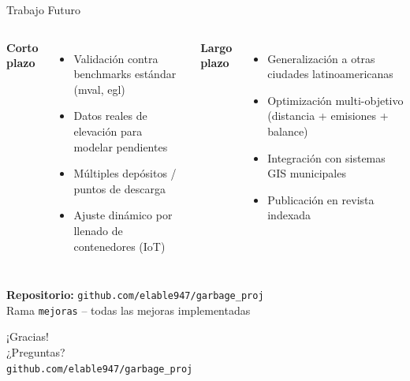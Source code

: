 \documentclass[11pt,aspectratio=169]{beamer}
\begin{document}
\begin{frame}{Trabajo Futuro}
\begin{columns}[T]
\textbf{Corto plazo}
\begin{itemize}
  \item Validación contra benchmarks estándar (mval, egl)
  \item Datos reales de elevación para modelar pendientes
  \item Múltiples depósitos / puntos de descarga
  \item Ajuste dinámico por llenado de contenedores (IoT)
\end{itemize}

\textbf{Largo plazo}
\begin{itemize}
  \item Generalización a otras ciudades latinoamericanas
  \item Optimización multi-objetivo (distancia + emisiones + balance)
  \item Integración con sistemas GIS municipales
  \item Publicación en revista indexada
\end{itemize}
\end{columns}

\vspace{16pt}
\begin{center}
\large\textbf{Repositorio:} \texttt{github.com/elable947/garbage\_proj}\\[4pt]
Rama \texttt{mejoras} -- todas las mejoras implementadas
\end{center}
\end{frame}

\begin{frame}[plain]
\begin{center}
\Huge\textcolor{myblue}{¡Gracias!}\\[16pt]
\Large ¿Preguntas?\\[24pt]
\normalsize
\texttt{github.com/elable947/garbage\_proj}
\end{center}
\end{frame}
\end{document}

